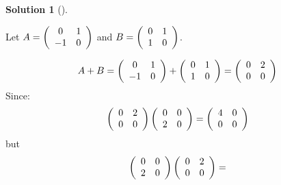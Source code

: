 \documentclass[numbers=enddot,12pt,final,onecolumn,notitlepage]{scrartcl}
\newcounter{sol}
\theoremstyle{definition}
\newtheorem{solu}[sol]{Solution}
\newenvironment{solution}[1][]
{\begin{solu}[#1]\begin{leftbar}}
        {\end{leftbar}\end{solu}}
\begin{document}
\begin{solution}
	Let $A = \left(\begin{array}
				[c]{cc}%
				0  & 1 \\
				-1 & 0 \\
			\end{array}\right)$ and
	$B = \left(\begin{array}
				[c]{cc}%
				0 & 1 \\
				1 & 0 \\
			\end{array}\right)$.

	\[
		A + B = \left(\begin{array}
				[c]{cc}%
				0  & 1 \\
				-1 & 0 \\
			\end{array}\right) +
		\left(\begin{array}
				[c]{cc}%
				0 & 1 \\
				1 & 0 \\
			\end{array}\right) =
		\left(\begin{array}
				[c]{cc}%
				0 & 2 \\
				0 & 0 \\
			\end{array}\right)
	\]
	Since:
	\[
		\left(\begin{array}
				[c]{cc}%
				0 & 2 \\
				0 & 0 \\
			\end{array}\right)
		\left(\begin{array}
				[c]{cc}%
				0 & 0 \\
				2 & 0 \\
			\end{array}\right) =
		\left(\begin{array}
				[c]{cc}%
				4 & 0 \\
				0 & 0 \\
			\end{array}\right)
	\]
	but
	\[
		\left(\begin{array}
				[c]{cc}%
				0 & 0 \\
				2 & 0 \\
			\end{array}\right)
		\left(\begin{array}
				[c]{cc}%
				0 & 2 \\
				0 & 0 \\
			\end{array}\right) =
\]
\end{solution}
\end{document}
